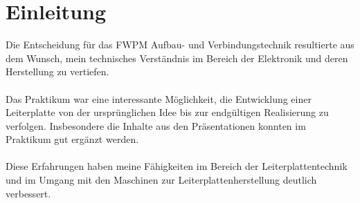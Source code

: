 
\section*{Einleitung}
Die Entscheidung für das FWPM Aufbau- und Verbindungstechnik resultierte aus dem Wunsch, mein technisches Verständnis im Bereich der Elektronik und deren Herstellung zu vertiefen.
\\
\\
Das Praktikum war eine interessante Möglichkeit, die Entwicklung einer Leiterplatte von der ursprünglichen Idee bis zur endgültigen Realisierung zu verfolgen.
Insbesondere die Inhalte aus den Präsentationen konnten im Praktikum gut ergänzt werden.
\\
\\
Diese Erfahrungen haben meine Fähigkeiten im Bereich der Leiterplattentechnik und im Umgang mit den Maschinen zur Leiterplattenherstellung deutlich verbessert.
